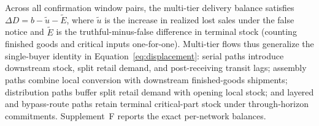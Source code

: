 \documentclass[preprint,11pt,authoryear]{elsarticle}
\begin{document}
Across all  confirmation window pairs, the multi-tier delivery balance satisfies $\Delta D=b-\widetilde u-\widetilde E$, where $\widetilde u$ is the increase in realized lost sales under the false notice and $\widetilde E$ is the truthful-minus-false difference in terminal stock (counting finished goods and critical inputs one-for-one). Multi-tier flows thus generalize the single-buyer identity in Equation~\eqref{eq:displacement}: serial paths introduce downstream stock, split retail demand, and post-receiving transit lags; assembly paths combine local conversion with downstream finished-goods shipments; distribution paths buffer split retail demand with opening local stock; and layered and bypass-route paths retain terminal critical-part stock under through-horizon commitments. Supplement~F reports the exact per-network balances.
\end{document}
